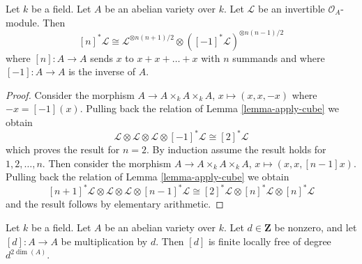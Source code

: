 \begin{lemma}
\label{lemma-pullbacks-by-n}
Let $k$ be a field. Let $A$ be an abelian variety over $k$.
Let $\mathcal{L}$ be an invertible $\mathcal{O}_A$-module.
Then
$$
[n]^*\mathcal{L} \cong
\mathcal{L}^{\otimes n(n + 1)/2} \otimes
([-1]^*\mathcal{L})^{\otimes n(n - 1)/2}
$$
where $[n] : A \to A$ sends $x$ to $x + x + \ldots + x$ with $n$ summands
and where $[-1] : A \to A$ is the inverse of $A$.
\end{lemma}

\begin{proof}
Consider the morphism $A \to A \times_k A \times_k A$,
$x \mapsto (x, x, -x)$ where $-x = [-1](x)$. Pulling back
the relation of Lemma \ref{lemma-apply-cube} we obtain
$$
\mathcal{L} \otimes
\mathcal{L} \otimes
\mathcal{L} \otimes
[-1]^*\mathcal{L} \cong
[2]^*\mathcal{L}
$$
which proves the result for $n = 2$. By induction assume the result holds
for $1, 2, \ldots, n$. Then consider the morphism
$A \to A \times_k A \times_k A$, $x \mapsto (x, x, [n - 1]x)$.
Pulling back
the relation of Lemma \ref{lemma-apply-cube} we obtain
$$
[n + 1]^*\mathcal{L} \otimes
\mathcal{L} \otimes
\mathcal{L} \otimes
[n - 1]^*\mathcal{L} \cong
[2]^*\mathcal{L} \otimes
[n]^*\mathcal{L} \otimes
[n]^*\mathcal{L}
$$
and the result follows by elementary arithmetic.
\end{proof}

\begin{lemma}
\label{lemma-degree-multiplication-by-d}
Let $k$ be a field. Let $A$ be an abelian variety over $k$.
Let $d \in \mathbf{Z}$ be nonzero, and let
$[d] : A \to A$ be multiplication by $d$.
Then $[d]$ is finite locally free of degree $d^{2\dim(A)}$.
\end{lemma}

